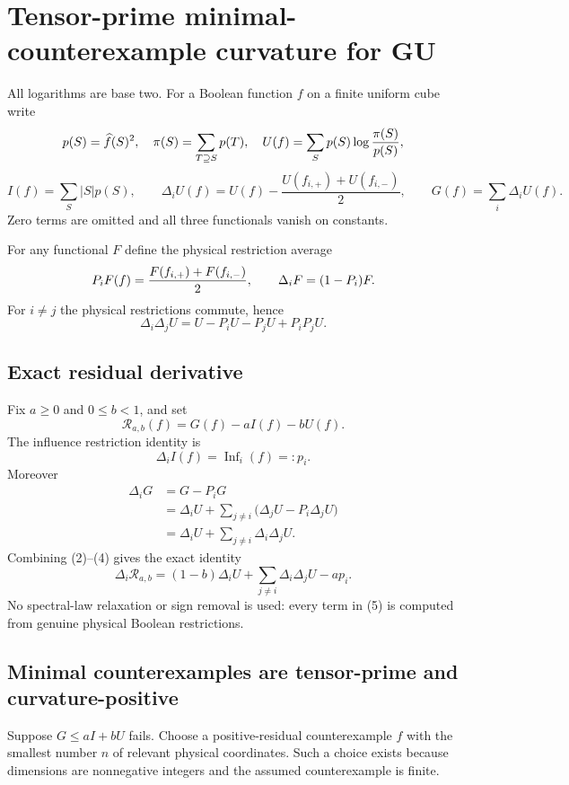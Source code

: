 \section*{Tensor-prime minimal-counterexample curvature for GU}

All logarithms are base two.  For a Boolean function $f$ on a finite
uniform cube write
\[
 p(S)=\widehat f(S)^2,\quad \pi(S)=\sum_{T\supseteq S}p(T),\quad
 U(f)=\sum_Sp(S)\log {\pi(S)\over p(S)},
\]
\[
 I(f)=\sum_S|S|p(S),\qquad
 \Delta_iU(f)=U(f)-\frac{U(f_{i,+})+U(f_{i,-})}{2},\qquad
 G(f)=\sum_i\Delta_iU(f).
\]
Zero terms are omitted and all three functionals vanish on constants.

For any functional $F$ define the physical restriction average
\[
 P_iF(f)={F(f_{i,+})+F(f_{i,-})\over2},\qquad
 \Delta_iF=(1-P_i)F.
\]
For $i\ne j$ the physical restrictions commute, hence
\[
 \Delta_i\Delta_jU
 =U-P_iU-P_jU+P_iP_jU.                              \tag{1}
\]

\subsection*{Exact residual derivative}

Fix $a\ge0$ and $0\le b<1$, and set
\[
 \mathcal R_{a,b}(f)=G(f)-aI(f)-bU(f).                \tag{2}
\]
The influence restriction identity is
\[
 \Delta_i I(f)=\operatorname{Inf}_i(f)=:p_i.         \tag{3}
\]
Moreover
\[
 \begin{aligned}
 \Delta_iG
 &=G-P_iG\\
 &=\Delta_iU+\sum_{j\ne i}
       \bigl(\Delta_jU-P_i\Delta_jU\bigr)\\
 &=\Delta_iU+\sum_{j\ne i}\Delta_i\Delta_jU.
 \end{aligned}                                       \tag{4}
\]
Combining (2)--(4) gives the exact identity
\[
 \boxed{
 \Delta_i\mathcal R_{a,b}
 =(1-b)\Delta_iU+\sum_{j\ne i}\Delta_i\Delta_jU-a p_i.}
                                                               \tag{5}
\]
No spectral-law relaxation or sign removal is used: every term in (5) is
computed from genuine physical Boolean restrictions.

\subsection*{Minimal counterexamples are tensor-prime and curvature-positive}

Suppose $G\le aI+bU$ fails.  Choose a positive-residual counterexample
$f$ with the smallest number $n$ of relevant physical coordinates.  Such
a choice exists because dimensions are nonnegative integers and the
assumed counterexample is finite.

